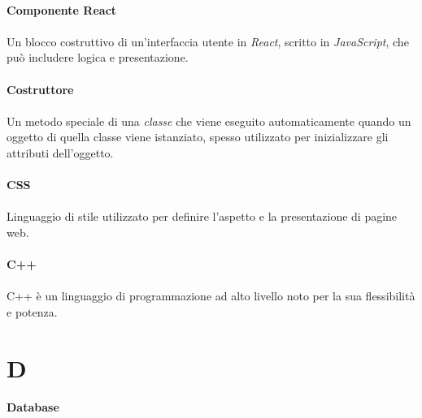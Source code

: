 \documentclass[10pt, a4paper]{article}
\begin{document}
\paragraph{Componente React}\noindent\hrulefill
\paragraph{}Un blocco costruttivo di un'interfaccia utente in \textit{React\pg}, scritto in \textit{JavaScript\pg}, che può includere logica e presentazione.


\vspace{2em}
\paragraph{Costruttore}\noindent\hrulefill
\paragraph{}Un metodo speciale di una \textit{classe\pg} che viene eseguito automaticamente quando un oggetto di quella classe viene istanziato, spesso utilizzato per inizializzare gli attributi dell'oggetto.

\vspace{2em}
\paragraph{CSS}\noindent\hrulefill
\paragraph{}Linguaggio di stile utilizzato per definire l'aspetto e la presentazione di pagine web.

\vspace{2em}
\paragraph{C++}\noindent\hrulefill
\paragraph{}C++ è un linguaggio di programmazione ad alto livello noto per la sua flessibilità e potenza.

\newpage
\section{D}
\vspace{2em}
\paragraph{Database}\noindent\hrulefill
\end{document}
